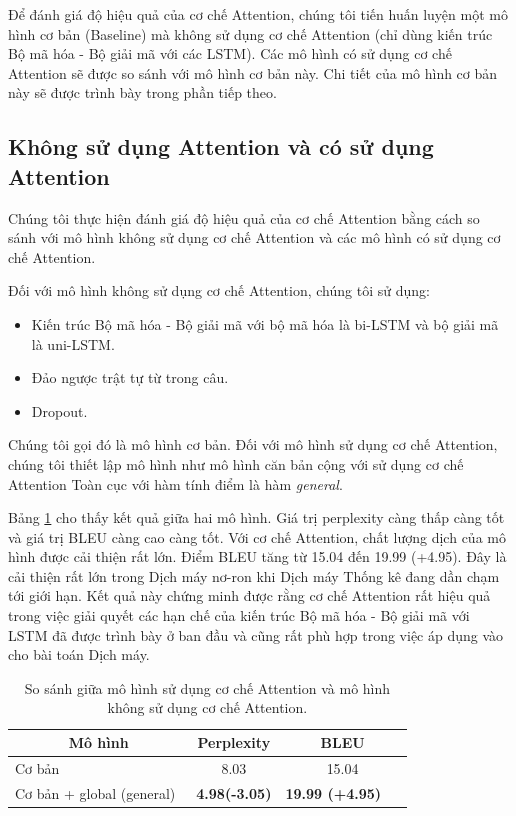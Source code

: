 Để đánh giá độ hiệu quả của cơ chế Attention, chúng tôi tiến huấn luyện một mô hình cơ bản (Baseline) mà không sử dụng cơ chế Attention (chỉ dùng kiến trúc Bộ mã hóa - Bộ giải mã với các LSTM). Các mô hình có sử dụng cơ chế Attention sẽ được so sánh với mô hình cơ bản này. Chi tiết của mô hình cơ bản này sẽ được trình bày trong phần tiếp theo.

\subsection{Không sử dụng Attention và có sử dụng Attention}
Chúng tôi thực hiện đánh giá độ hiệu quả của cơ chế Attention bằng cách so sánh với mô hình không sử dụng cơ chế Attention và các mô hình có sử dụng cơ chế Attention.

Đối với mô hình không sử dụng cơ chế Attention, chúng tôi sử dụng: 
\begin{itemize}
	\item Kiến trúc Bộ mã hóa - Bộ giải mã với bộ mã hóa là bi-LSTM và bộ giải mã là uni-LSTM.
	\item Đảo ngược trật tự từ trong câu.
	\item Dropout.
\end{itemize}
Chúng tôi gọi đó là mô hình cơ bản. Đối với mô hình sử dụng cơ chế Attention, chúng tôi thiết lập mô hình như mô hình căn bản cộng với sử dụng cơ chế Attention Toàn cục với hàm tính điểm là hàm \textit{general}.

Bảng \ref{tab_non-attn_vs_attn} cho thấy kết quả giữa hai mô hình. Giá trị perplexity càng thấp càng tốt và giá trị BLEU càng cao càng tốt. Với cơ chế Attention, chất lượng dịch của mô hình được cải thiện rất lớn. Điểm BLEU tăng từ 15.04 đến 19.99 (+4.95). Đây là cải thiện rất lớn trong Dịch máy nơ-ron khi Dịch máy Thống kê đang dần chạm tới giới hạn. Kết quả này chứng minh được rằng cơ chế Attention rất hiệu quả trong việc giải quyết các hạn chế của kiến trúc Bộ mã hóa - Bộ giải mã với LSTM đã được trình bày ở ban đầu và cũng rất phù hợp trong việc áp dụng vào cho bài toán Dịch máy.

\begin{table}
	\centering
	\caption{So sánh giữa mô hình sử dụng cơ chế Attention và mô hình không sử dụng cơ chế Attention.}
	\begin{tabular}{|l|c|c|} 
		\hline
		\multicolumn{1}{|c|}{ \textbf{Mô hình} } & \textbf{Perplexity}   & \textbf{BLEU}              \\ 
		\hline
		Cơ bản                                   & 8.03                  & 15.04                      \\ 
		\hline
		Cơ bản + global (general)~               & \textbf{4.98(-3.05)}  & \textbf{19.99 (+4.95)}~ ~  \\
		\hline
	\end{tabular}
	\label{tab_non-attn_vs_attn}
\end{table}

